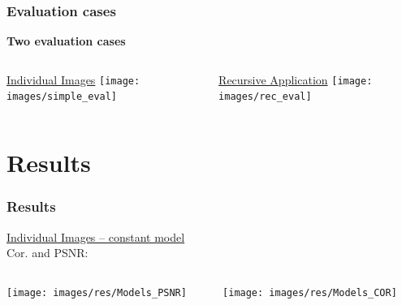 \documentclass[18pt]{beamer}
\begin{document}
\begin{frame}[t]
  \frametitle{Evaluation cases}
  \begin{center}
    \textbf{\Large Two evaluation cases}
  \end{center}
  \vspace{-1cm}
  \begin{columns}[t]
    \begin{column}{0.5\textwidth}
      \begin{center}
        {\large \underline{Individual Images}}
        \texttt{[image: images/simple\_eval]}
      \end{center}
    \end{column}
    \begin{column}{0.5\textwidth}
      \begin{center}
        {\large \underline{Recursive Application}}
        \texttt{[image: images/rec\_eval]}
      \end{center}
    \end{column}
  \end{columns}
\end{frame}

\section{Results}
\begin{frame}[t]
  \frametitle{Results}
  \vspace{-1cm}
  \begin{center}
    {\large \underline{Individual Images -- constant model}} \\
    Cor. and PSNR:
  \end{center}
  \vspace{-1.3cm}
  \begin{columns}[t]
    \begin{column}{0.5\textwidth}
      \begin{center}
        \texttt{[image: images/res/Models\_PSNR]}
      \end{center}
    \end{column}
    \begin{column}{0.5\textwidth}
      \begin{center}
        \texttt{[image: images/res/Models\_COR]}
      \end{center}
    \end{column}
  \end{columns}
\end{frame}
\end{document}
